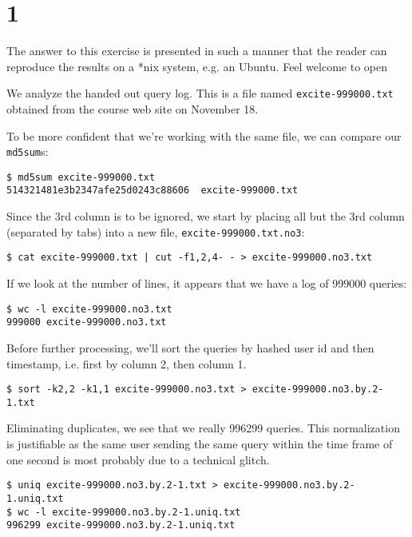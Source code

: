 
\section{1}

\label{appendix:1}

The answer to this exercise is presented in such a manner that the reader can
reproduce the results on a *nix system, e.g. an Ubuntu. Feel welcome to open 


We analyze the handed out query log. This is a file named
\texttt{excite-999000.txt} obtained from the course web site on November 18.


To
be more confident that we're working with the same file, we can compare our
\texttt{md5sum}s:

\begin{lstlisting}
$ md5sum excite-999000.txt
514321481e3b2347afe25d0243c88606  excite-999000.txt
\end{lstlisting}

Since the 3rd column is to be ignored, we start by placing all but the 3rd
column (separated by tabs) into a new file, \texttt{excite-999000.txt.no3}:

\begin{verbatim}
$ cat excite-999000.txt | cut -f1,2,4- - > excite-999000.no3.txt
\end{verbatim}

If we look at the number of lines, it appears that we have a log of 999000
queries:

\begin{verbatim}
$ wc -l excite-999000.no3.txt
999000 excite-999000.no3.txt
\end{verbatim}

Before further processing, we'll sort the queries by hashed user id and then
timestamp, i.e. first by column 2, then column 1.

\begin{verbatim}
$ sort -k2,2 -k1,1 excite-999000.no3.txt > excite-999000.no3.by.2-1.txt
\end{verbatim}

Eliminating duplicates, we see that we really 996299 queries. This
normalization is justifiable as the same user sending the same query within the
time frame of one second is most probably due to a technical glitch.

\begin{verbatim}
$ uniq excite-999000.no3.by.2-1.txt > excite-999000.no3.by.2-1.uniq.txt
$ wc -l excite-999000.no3.by.2-1.uniq.txt 
996299 excite-999000.no3.by.2-1.uniq.txt
\end{verbatim}

